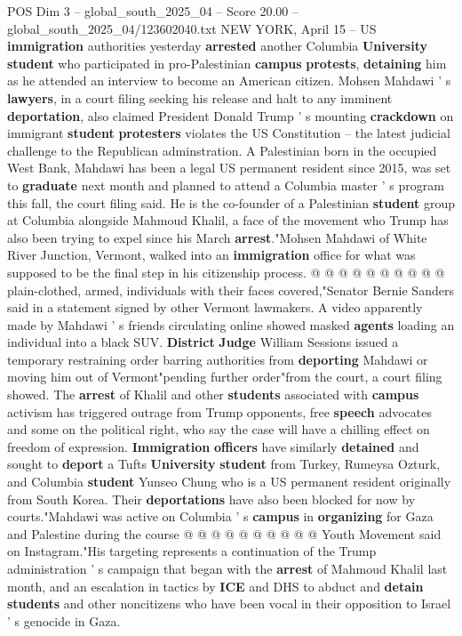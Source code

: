 \begin{textsample}{POS Dim 3 – global\_south\_2025\_04 – Score 20.00 – global\_south\_2025\_04/123602040.txt}  \label{ex:f3_pos_120}
NEW YORK, April 15 -- US \textbf{immigration} authorities yesterday \textbf{arrested} another Columbia \textbf{University} \textbf{student} who participated in pro-Palestinian \textbf{campus} \textbf{protests}, \textbf{detaining} him as he attended an interview to become an American citizen.
Mohsen Mahdawi ' s \textbf{lawyers}, in a court filing seeking his release and halt to any imminent \textbf{deportation}, also claimed President Donald Trump ' s mounting \textbf{crackdown} on immigrant \textbf{student} \textbf{protesters} violates the US Constitution -- the latest judicial challenge to the Republican adminstration.
A Palestinian born in the occupied West Bank, Mahdawi has been a legal US permanent resident since 2015, was set to \textbf{graduate} next month and planned to attend a Columbia master ' s program this fall, the court filing said.
He is the co-founder of a Palestinian \textbf{student} group at Columbia alongside Mahmoud Khalil, a face of the movement who Trump has also been trying to expel since his March \textbf{arrest}."Mohsen Mahdawi of White River Junction, Vermont, walked into an \textbf{immigration} office for what was supposed to be the final step in his citizenship process. @ @ @ @ @ @ @ @ @ @ plain-clothed, armed, individuals with their faces covered,"Senator Bernie Sanders said in a statement signed by other Vermont lawmakers.
A video apparently made by Mahdawi ' s friends circulating online showed masked \textbf{agents} loading an individual into a black SUV. \textbf{District} \textbf{Judge} William Sessions issued a temporary restraining order barring authorities from \textbf{deporting} Mahdawi or moving him out of Vermont"pending further order"from the court, a court filing showed.
The \textbf{arrest} of Khalil and other \textbf{students} associated with \textbf{campus} activism has triggered outrage from Trump opponents, free \textbf{speech} advocates and some on the political right, who say the case will have a chilling effect on freedom of expression. \textbf{Immigration} \textbf{officers} have similarly \textbf{detained} and sought to \textbf{deport} a Tufts \textbf{University} \textbf{student} from Turkey, Rumeysa Ozturk, and Columbia \textbf{student} Yunseo Chung who is a US permanent resident originally from South Korea.
Their \textbf{deportations} have also been blocked for now by courts."Mahdawi was active on Columbia ' s \textbf{campus} in \textbf{organizing} for Gaza and Palestine during the course @ @ @ @ @ @ @ @ @ @ Youth Movement said on Instagram."His targeting represents a continuation of the Trump administration ' s campaign that began with the \textbf{arrest} of Mahmoud Khalil last month, and an escalation in tactics by \textbf{ICE} and DHS to abduct and \textbf{detain} \textbf{students} and other noncitizens who have been vocal in their opposition to Israel ' s genocide in Gaza.

\end{textsample}
